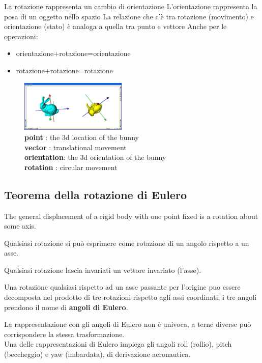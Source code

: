 \documentclass[a4paper, 10pt]{article}
\begin{document}
		\noindent
		La rotazione rappresenta un cambio di orientazione
		L'orientazione rappresenta la posa di un oggetto nello spazio
		La relazione che c'è tra rotazione (movimento) e orientazione
		(stato) è analoga a quella tra punto e vettore
		Anche per le operazioni:
		\begin{itemize}
			\item orientazione+rotazione=orientazione
			\item rotazione+rotazione=rotazione
		\end{itemize}
		
		\begin{figure}
			\includegraphics[width=0.45\textwidth]{bunny}
			\caption*{
				\textbf{point} : the 3d location of the bunny \\
				\textbf{vector} : translational movement\\
				\textbf{orientation}: the 3d orientation of the bunny\\
				\textbf{rotation} : circular movement
			}
		\end{figure}
		
	\subsection{Teorema della rotazione di Eulero}
		The general displacement of a rigid body with
		one point fixed is a rotation about some axis.
		
		\noindent
		Qualsiasi rotazione si può esprimere come rotazione di un
		angolo rispetto a un asse.
		
		\noindent
		Qualsiasi rotazione lascia invariati un vettore invariato (l'asse).
		
		\noindent
		Una rotazione qualsiasi rispetto ad un asse passante per
		l'origine puo essere decomposta nel prodotto di tre rotazioni
		rispetto agli assi coordinati; i tre angoli prendono il nome di
		\textbf{angoli di Eulero}.
		
		\noindent
		La rappresentazione con gli angoli di Eulero non è univoca, a
		terne diverse può corrispondere la stessa trasformazione.\\
		Una delle rappresentazioni di Eulero impiega gli angoli roll (rollio),
		pitch (beccheggio) e yaw (imbardata), di derivazione aeronautica.
		
		
\end{document}
